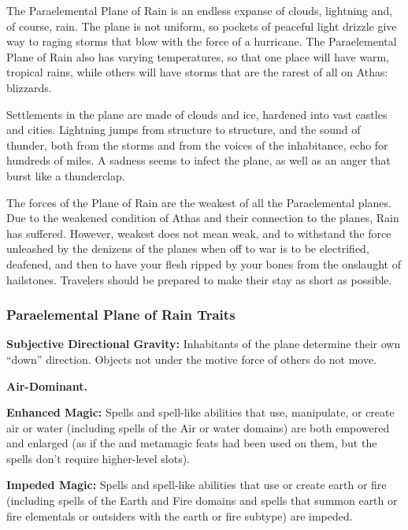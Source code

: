 The Paraelemental Plane of Rain is an endless expanse of clouds, lightning and, of course, rain. The plane is not uniform, so pockets of peaceful light drizzle give way to raging storms that blow with the force of a hurricane. The Paraelemental Plane of Rain also has varying temperatures, so that one place will have warm, tropical rains, while others will have storms that are the rarest of all on Athas: blizzards.

Settlements in the plane are made of clouds and ice, hardened into vast castles and cities. Lightning jumps from structure to structure, and the sound of thunder, both from the storms and from the voices of the inhabitance, echo for hundreds of miles. A sadness seems to infect the plane, as well as an anger that burst like a thunderclap.

The forces of the Plane of Rain are the weakest of all the Paraelemental planes. Due to the weakened condition of Athas and their connection to the planes, Rain has suffered. However, weakest does not mean weak, and to withstand the force unleashed by the denizens of the planes when off to war is to be electrified, deafened, and then to have your flesh ripped by your bones from the onslaught of hailstones. Travelers should be prepared to make their stay as short as possible.

\subsubsection{Paraelemental Plane of Rain Traits}
\begin{itemize*}
\item \textbf{Subjective Directional Gravity:} Inhabitants of the plane determine their own ``down'' direction. Objects not under the motive force of others do not move.
\item \textbf{Air-Dominant.}
\item \textbf{Enhanced Magic:} Spells and spell-like abilities that use, manipulate, or create air or water (including spells of the Air or water domains) are both empowered and enlarged (as if the  and  metamagic feats had been used on them, but the spells don't require higher-level slots).
\item \textbf{Impeded Magic:} Spells and spell-like abilities that use or create earth or fire (including spells of the Earth and Fire domains and spells that summon earth or fire elementals or outsiders with the earth or fire subtype) are impeded.
\end{itemize*}
